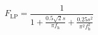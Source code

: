 \begin{equation}
F_{\mathrm{LP}} = \frac{1}{1 + \frac{0.5 \sqrt{2} s}{\pi f_{\mathrm{h}}} + \frac{0.25 s^{2}}{\pi^{2} f_{\mathrm{h}}^{2}}}
\end{equation}

